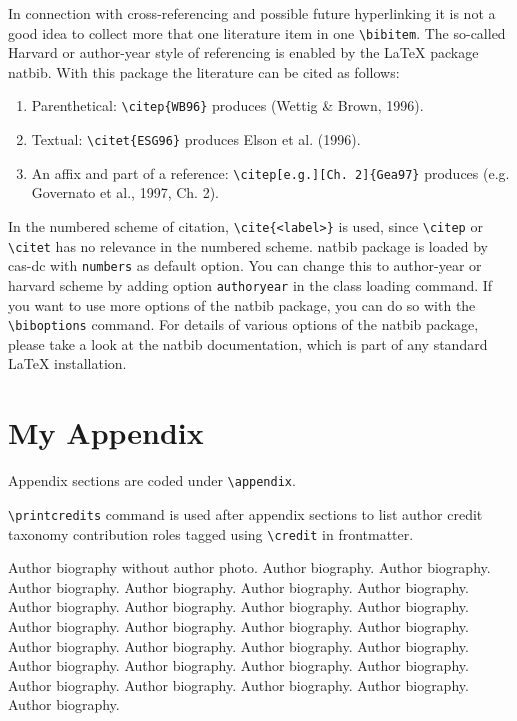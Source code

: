 \documentclass[a4paper,fleqn]{cas-dc}
\begin{document}
\noindent In connection with cross-referencing and
possible future hyperlinking it is not a good idea to collect
more that one literature item in one \verb+\bibitem+.  The
so-called Harvard or author-year style of referencing is enabled
by the \LaTeX{} package {natbib}. With this package the
literature can be cited as follows:

\begin{enumerate}[\textbullet]
\item Parenthetical: \verb+\citep{WB96}+ produces (Wettig \& Brown, 1996).
\item Textual: \verb+\citet{ESG96}+ produces Elson et al. (1996).
\item An affix and part of a reference:\break
\verb+\citep[e.g.][Ch. 2]{Gea97}+ produces (e.g. Governato et
al., 1997, Ch. 2).
\end{enumerate}

In the numbered scheme of citation, \verb+\cite{<label>}+ is used,
since \verb+\citep+ or \verb+\citet+ has no relevance in the numbered
scheme.  {natbib} package is loaded by {cas-dc} with
\verb+numbers+ as default option.  You can change this to author-year
or harvard scheme by adding option \verb+authoryear+ in the class
loading command.  If you want to use more options of the {natbib}
package, you can do so with the \verb+\biboptions+ command.  For
details of various options of the {natbib} package, please take a
look at the {natbib} documentation, which is part of any standard
\LaTeX{} installation.

\appendix
\section{My Appendix}
Appendix sections are coded under \verb+\appendix+.

\verb+\printcredits+ command is used after appendix sections to list 
author credit taxonomy contribution roles tagged using \verb+\credit+ 
in frontmatter.

\printcredits

%






\bio{}
Author biography without author photo.
Author biography. Author biography. Author biography.
Author biography. Author biography. Author biography.
Author biography. Author biography. Author biography.
Author biography. Author biography. Author biography.
Author biography. Author biography. Author biography.
Author biography. Author biography. Author biography.
Author biography. Author biography. Author biography.
Author biography. Author biography. Author biography.
Author biography. Author biography. Author biography.
\endbio
\end{document}
